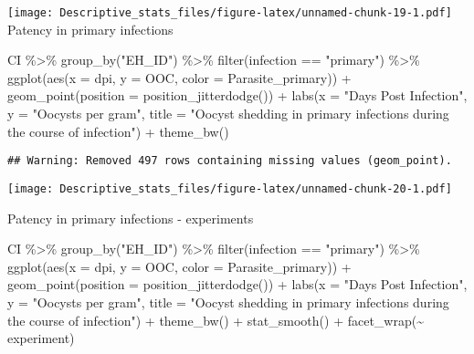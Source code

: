 \documentclass[
]{article}
\newenvironment{Shaded}{\begin{snugshade}}{\end{snugshade}}
\newcommand{\AttributeTok}[1]{\textcolor[rgb]{0.77,0.63,0.00}{#1}}
\newcommand{\FunctionTok}[1]{\textcolor[rgb]{0.00,0.00,0.00}{#1}}
\newcommand{\NormalTok}[1]{#1}
\newcommand{\SpecialCharTok}[1]{\textcolor[rgb]{0.00,0.00,0.00}{#1}}
\newcommand{\StringTok}[1]{\textcolor[rgb]{0.31,0.60,0.02}{#1}}
\begin{document}
\texttt{[image: Descriptive\_stats\_files/figure-latex/unnamed-chunk-19-1.pdf]}
Patency in primary infections

\begin{Shaded}
\begin{Highlighting}[]
\NormalTok{CI }\SpecialCharTok{\%\textgreater{}\%}
  \FunctionTok{group\_by}\NormalTok{(}\StringTok{"EH\_ID"}\NormalTok{) }\SpecialCharTok{\%\textgreater{}\%}
  \FunctionTok{filter}\NormalTok{(infection }\SpecialCharTok{==} \StringTok{"primary"}\NormalTok{) }\SpecialCharTok{\%\textgreater{}\%}
  \FunctionTok{ggplot}\NormalTok{(}\FunctionTok{aes}\NormalTok{(}\AttributeTok{x =}\NormalTok{ dpi, }\AttributeTok{y =}\NormalTok{ OOC, }\AttributeTok{color =}\NormalTok{ Parasite\_primary)) }\SpecialCharTok{+}
  \FunctionTok{geom\_point}\NormalTok{(}\AttributeTok{position =} \FunctionTok{position\_jitterdodge}\NormalTok{()) }\SpecialCharTok{+}
  \FunctionTok{labs}\NormalTok{(}\AttributeTok{x =} \StringTok{"Days Post Infection"}\NormalTok{, }\AttributeTok{y =} \StringTok{"Oocysts per gram"}\NormalTok{,}
       \AttributeTok{title =} \StringTok{"Oocyst shedding in primary infections during the }
\StringTok{       course of infection"}\NormalTok{) }\SpecialCharTok{+}
    \FunctionTok{theme\_bw}\NormalTok{() }
\end{Highlighting}
\end{Shaded}

\begin{verbatim}
## Warning: Removed 497 rows containing missing values (geom_point).
\end{verbatim}

\texttt{[image: Descriptive\_stats\_files/figure-latex/unnamed-chunk-20-1.pdf]}

Patency in primary infections - experiments

\begin{Shaded}
\begin{Highlighting}[]
\NormalTok{CI }\SpecialCharTok{\%\textgreater{}\%}
  \FunctionTok{group\_by}\NormalTok{(}\StringTok{"EH\_ID"}\NormalTok{) }\SpecialCharTok{\%\textgreater{}\%}
  \FunctionTok{filter}\NormalTok{(infection }\SpecialCharTok{==} \StringTok{"primary"}\NormalTok{) }\SpecialCharTok{\%\textgreater{}\%}
  \FunctionTok{ggplot}\NormalTok{(}\FunctionTok{aes}\NormalTok{(}\AttributeTok{x =}\NormalTok{ dpi, }\AttributeTok{y =}\NormalTok{ OOC, }\AttributeTok{color =}\NormalTok{ Parasite\_primary)) }\SpecialCharTok{+}
  \FunctionTok{geom\_point}\NormalTok{(}\AttributeTok{position =} \FunctionTok{position\_jitterdodge}\NormalTok{()) }\SpecialCharTok{+}
  \FunctionTok{labs}\NormalTok{(}\AttributeTok{x =} \StringTok{"Days Post Infection"}\NormalTok{, }\AttributeTok{y =} \StringTok{"Oocysts per gram"}\NormalTok{,}
       \AttributeTok{title =} \StringTok{"Oocyst shedding in primary infections during the }
\StringTok{       course of infection"}\NormalTok{) }\SpecialCharTok{+}
    \FunctionTok{theme\_bw}\NormalTok{() }\SpecialCharTok{+}
    \FunctionTok{stat\_smooth}\NormalTok{() }\SpecialCharTok{+}
    \FunctionTok{facet\_wrap}\NormalTok{(}\SpecialCharTok{\textasciitilde{}}\NormalTok{ experiment)}
\end{Highlighting}
\end{Shaded}
\end{document}
